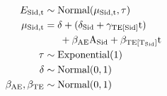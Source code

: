 \documentclass[12pt,preview,border=5mm]{standalone}
\begin{document}
\begin{equation}
    \begin{aligned}
       E_{\mathrm{Sid},\mathrm{t}}      & \sim \text{Normal}( \mu_{\mathrm{Sid},\mathrm{t}}, \tau )                   \\
       \mu_{\mathrm{Sid},\mathrm{t}}    & = \delta + (\delta_{\mathrm{Sid}} + \gamma_{\mathrm{TE[\mathrm{Sid}]}} \text{t}) \\
                              & \phantom{PP} + \beta_{\mathrm{AE}} \text{A}_{\mathrm{Sid}}  + \beta_{\mathrm{TE [T_{\mathrm{Sid}}]}} \text{t}  \\
       \tau                   & \sim \text{Exponential}(1)  \\
       \delta                 & \sim \text{Normal}(0, 1)  \\
       \beta_{\mathrm{AE}}, \beta_{\mathrm{TE}} & \sim \text{Normal}(0, 1)
    \end{aligned}
\end{equation}
\end{document}
